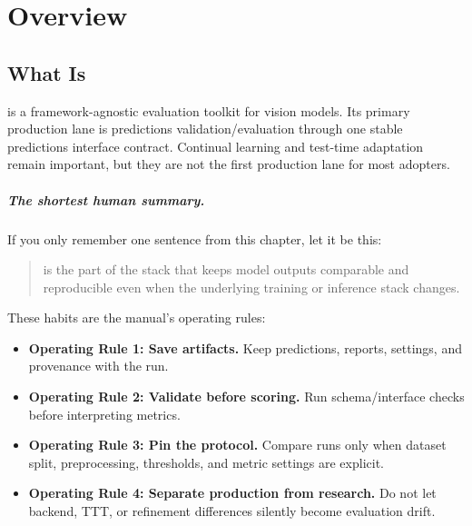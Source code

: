 \chapter{Overview}
\label{chap:overview}



\section{What \yolozu{} Is}
\yolozu{} is a framework-agnostic evaluation toolkit for vision models.
Its primary production lane is predictions validation/evaluation through one stable predictions interface contract.
Continual learning and test-time adaptation remain important, but they are not the first production lane for most adopters.

\paragraph{The shortest human summary.}
If you only remember one sentence from this chapter, let it be this:
\begin{quote}
\yolozu{} is the part of the stack that keeps model outputs comparable and reproducible even when the underlying training or inference stack changes.
\end{quote}

These habits are the manual's operating rules:
\begin{itemize}
  \item \textbf{Operating Rule 1: Save artifacts.} Keep predictions, reports, settings, and provenance with the run.
  \item \textbf{Operating Rule 2: Validate before scoring.} Run schema/interface checks before interpreting metrics.
  \item \textbf{Operating Rule 3: Pin the protocol.} Compare runs only when dataset split, preprocessing, thresholds, and metric settings are explicit.
  \item \textbf{Operating Rule 4: Separate production from research.} Do not let backend, TTT, or refinement differences silently become evaluation drift.
\end{itemize}


